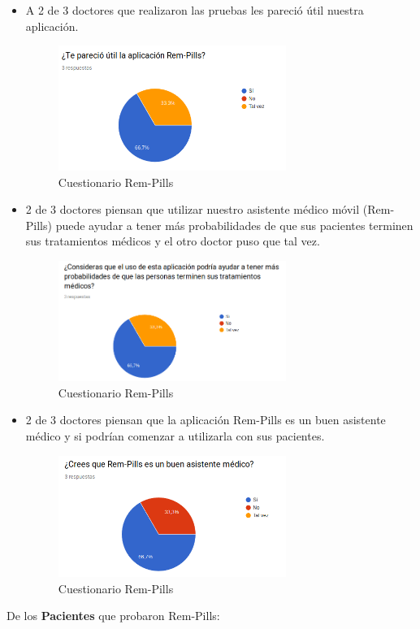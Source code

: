 \begin{itemize}
	\item A 2 de 3 doctores que realizaron las pruebas les pareció útil nuestra aplicación.
	\newpage
	\begin{figure}[htb]
		\centering
		\includegraphics[width=0.7\textwidth]{images/Pruebas/Doc1}
		\caption{Cuestionario Rem-Pills} 
		\label{fig:Doc1}
	\end{figure} 
%	 
	\item 2 de 3 doctores piensan que utilizar nuestro asistente médico móvil (Rem-Pills) puede ayudar a tener más probabilidades de que sus pacientes terminen sus tratamientos médicos y el otro doctor puso que tal vez.
	\begin{figure}[htb]
		\centering
		\includegraphics[width=0.7\textwidth]{images/Pruebas/Doc2}
		\caption{Cuestionario Rem-Pills} 
		\label{fig:Doc2}
	\end{figure} 
	
	
	\item 2 de 3 doctores piensan que la aplicación Rem-Pills es un buen asistente médico y si podrían comenzar a utilizarla con sus pacientes.
	\newpage
	\begin{figure}[htb]
		\centering
		\includegraphics[width=0.7\textwidth]{images/Pruebas/Doc4}
		\caption{Cuestionario Rem-Pills} 
		\label{fig:Doc4}
	\end{figure} 
%	
%	
\end{itemize}
De los \textbf{Pacientes} que probaron Rem-Pills:


